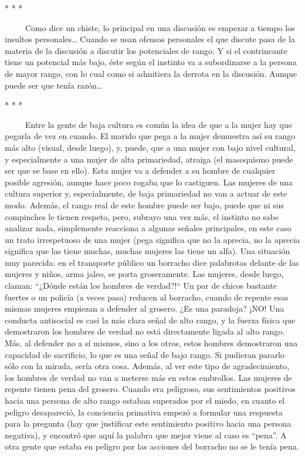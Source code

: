 \begin{center}
 *  *  * 
\end{center}

~ ~ ~ Como dice un chiste, lo principal en una discusión es empezar a
tiempo los insultos personales\ldots{} Cuando se usan ofensas personales
el que discute pasa de la materia de la discusión a discutir los
potenciales de rango. Y si el contrincante tiene un potencial más bajo,
éste según el instinto va a subordinarse a la persona de mayor rango,
con lo cual como si admitiera la derrota en la discusión. Aunque puede
ser que tenía razón\ldots{}

\begin{center}
 *  *  * 
\end{center}

~ ~ ~ Entre la gente de baja cultura es común la idea de que a la mujer
hay que pegarla de vez en cuando. El marido que pega a la mujer
demuestra así su rango más alto (visual, desde luego), y, puede, que a
una mujer con bajo nivel cultural, y especialmente a una mujer de alta
primariedad, atraiga (el masoquismo puede ser que se base en ello). Esta
mujer va a defender a su hombre de cualquier posible agresión, aunque
hace poco rogaba que lo castiguen. Las mujeres de una cultura superior
y, especialmente, de baja primariedad no van a actuar de este modo.
Además, el rango real de este hombre puede ser bajo, puede que ni sus
compinches le tienen respeto, pero, subrayo una vez más, el instinto no
sabe analizar nada, simplemente reacciona a algunas señales principales,
en este caso un trato irrespetuoso de una mujer (pega significa que no
la aprecia, no la aprecia significa que las tiene muchas, muchas mujeres
las tiene un alfa). Una situación muy parecida: en el transporte público
un borracho dice palabrotas delante de las mujeres y niños, arma jaleo,
se porta groseramente. Las mujeres, desde luego, claman: ``¿Dónde están
los hombres de verdad?!`` Un par de chicos bastante fuertes o un policía
(a veces pasa) reducen al borracho, cuando de repente esas mismas
mujeres empiezan a defender al grosero. ¿Es una paradoja? ¡NO! Una
conducta antisocial es casi la más clara señal de alto rango, y la
fuerza física que demostraron los hombres de verdad no está directamente
ligada al alto rango. Más, al defender no a sí mismos, sino a los otros,
estos hombres demostraron una capacidad de sacrificio, lo que es una
señal de bajo rango. Si pudieran pararlo sólo con la mirada, sería otra
cosa. Además, al ver este tipo de agradecimiento, los hombres de verdad
no van a meterse más en estos embrollos. Las mujeres de repente tienen
pena del grosero. Cuando era peligroso, sus sentimientos positivos hacia
una persona de alto rango estaban superados por el miedo, en cuanto el
peligro desapareció, la conciencia primativa empezó a formular una
respuesta para la pregunta (hay que justificar este sentimiento positivo
hacia una persona negativa), y encontró que aquí la palabra que mejor
viene al caso es ``pena''. A otra gente que estaba en peligro por las
acciones del borracho no se le tenía pena.

